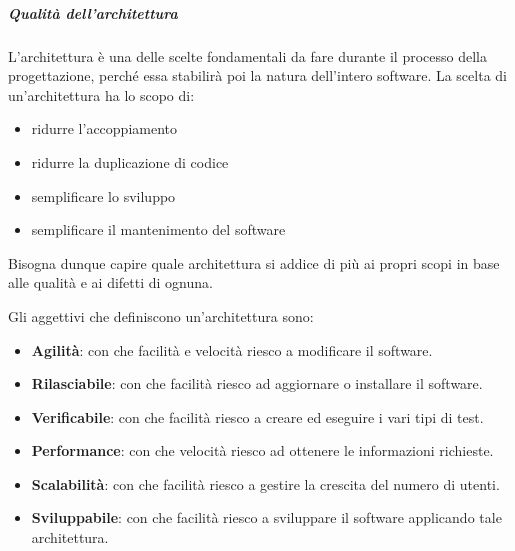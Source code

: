         \subparagraph{Qualità dell'architettura}\label{QualitaArchitettura}
        L'architettura è una delle scelte fondamentali da fare durante il processo della progettazione, perché essa stabilirà poi la natura dell'intero software.
        La scelta di un'architettura ha lo scopo di:
        \begin{itemize}
            \item ridurre l'accoppiamento
            \item ridurre la duplicazione di codice
            \item semplificare lo sviluppo
            \item semplificare il mantenimento del software
        \end{itemize}
        Bisogna dunque capire quale architettura si addice di più ai propri scopi in base alle qualità e ai difetti di ognuna. \par
        Gli aggettivi che definiscono un'architettura sono:
        \begin{itemize}
            \item \textbf{Agilità}: con che facilità e velocità riesco a modificare il software.
            \item \textbf{Rilasciabile}: con che facilità riesco ad aggiornare o installare il software.
            \item \textbf{Verificabile}: con che facilità riesco a creare ed eseguire i vari tipi di test.
            \item \textbf{Performance}: con che velocità riesco ad ottenere le informazioni richieste.
            \item \textbf{Scalabilità}: con che facilità riesco a gestire la crescita del numero di utenti.
            \item \textbf{Sviluppabile}: con che facilità riesco a sviluppare il software applicando tale architettura.
        \end{itemize}

